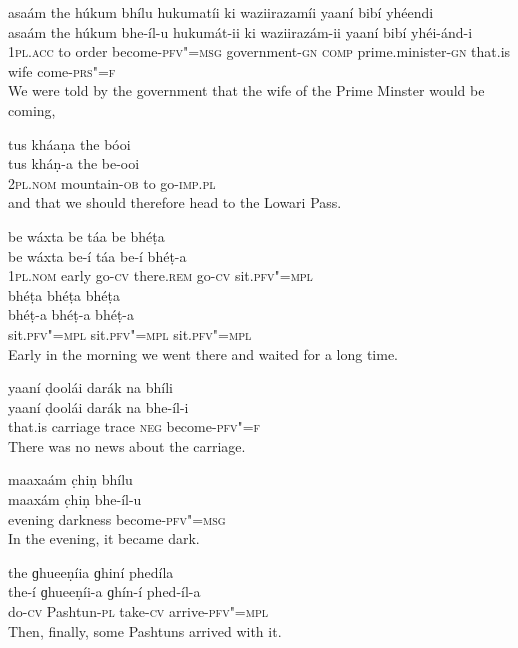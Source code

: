 \begin{exe}
\ex
\label{ex:1}
\glll asaám	the	húkum	bhílu	hukumatíi	ki waziirazamíi	yaaní	bibí	yhéendi \\
asaám	the	húkum	bhe-íl-u	hukumát-ii	ki waziirazám-ii	yaaní	bibí	yhéi-ánd-i \\
\textsc{1pl.acc} to	order	become-\textsc{pfv"=msg} government-\textsc{gn} \textsc{comp} prime.minister-\textsc{gn} that.is	wife	come-\textsc{prs"=f} \\
\glt We were told by the government that the wife of the Prime Minster would be coming,

\ex
\label{ex:2}
\glll tus	kháaṇa	the	bóoi \\
tus	kháṇ-a the	be-ooi \\
\textsc{2pl.nom} mountain-\textsc{ob} to go-\textsc{imp.pl} \\
\glt and that we should therefore head to the Lowari Pass.

\ex
\label{ex:3}
\glll be	wáxta	be	táa	be	bhéṭa \\
be	wáxta	be-í	táa	be-í	bhéṭ-a \\
\textsc{1pl.nom}	early	go-\textsc{cv}	there.\textsc{rem}	go-\textsc{cv}	sit.\textsc{pfv"=mpl} \\
\glll bhéṭa	bhéṭa	bhéṭa \\
bhéṭ-a	bhéṭ-a	bhéṭ-a \\
sit.\textsc{pfv"=mpl}	sit.\textsc{pfv"=mpl}	sit.\textsc{pfv"=mpl} \\
\glt Early in the morning we went there and waited for a long time.

\ex
\label{ex:4}
\glll yaaní	ḍoolái	darák	na	bhíli \\
yaaní	ḍoolái	darák	na	bhe-íl-i \\
that.is	carriage	trace	\textsc{neg}	become-\textsc{pfv"=f} \\
\glt There was no news about the carriage.

\ex
\label{ex:5}
\glll maaxaám	c̣hiṇ	bhílu \\
maaxám	c̣hiṇ	bhe-íl-u \\
evening	darkness	become-\textsc{pfv"=msg} \\
\glt In the evening, it became dark.

\ex
\label{ex:6}
\glll the	ɡhueeṇíia	ɡhiní	phedíla \\
the-í	ɡhueeṇíi-a	ɡhín-í	phed-íl-a \\
do-\textsc{cv}	Pashtun-\textsc{pl}	take-\textsc{cv}	arrive-\textsc{pfv"=mpl} \\
\glt Then, finally, some Pashtuns arrived with it.


\end{exe}

